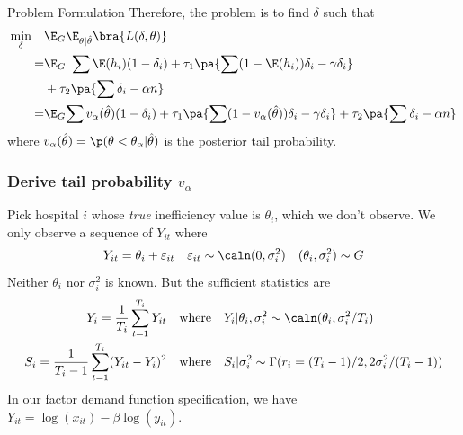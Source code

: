 \documentclass[10pt, aspectratio=169]{beamer}
\begin{document}
\begin{frame}{Problem Formulation}
  Therefore, the {problem} is to find $\delta$ such that
  \begin{align*}
    \min_{\delta} \quad & \E_G\E_{\theta|\hat{\theta}}\bra{L(\delta,\theta)}                                                                                                       \\
    =                   & \E_G \ \sum \E(h_i)(1-\delta_i) +\tau_1\pa{\sum (1-\E(h_i))\delta_i -\gamma \delta_i}                                                                    \\
                        & + \tau_2 \pa{\sum \delta_i -\alpha n}                                                                                                                    \\
    =                   & \E_G{\sum v_\alpha(\hat{\theta})(1-\delta_i) +\tau_1\pa{\sum (1-v_\alpha(\hat{\theta}))\delta_i -\gamma \delta_i} + \tau_2 \pa{\sum \delta_i -\alpha n}}
  \end{align*}
  where $v_\alpha(\hat{\theta})=\p(\theta<\theta_\alpha|\hat{\theta})$ is the \alert{posterior tail probability}.

\end{frame}
\begin{frame}[label=observation]
  \frametitle{Derive tail probability $v_\alpha$}
  Pick hospital $i$ whose \textit{true} inefficiency value is $\theta_i$, which we don't observe. We only observe a sequence of $Y_{it}$ where
  \begin{equation*}
    Y_{it} = \theta_i + \varepsilon_{it} \quad \varepsilon_{it} \sim \caln(0,\sigma_i^2) \quad (\theta_i,\sigma_i^2) \sim G
  \end{equation*}
  Neither $\theta_i$ nor $\sigma_i^2$ is known. But the sufficient statistics are
  \begin{align*}
    Y_i=\frac{1}{T_i}\sum_{t=1}^{T_i}Y_{it}           & \quad \text{where}\quad Y_i|\theta_i,\sigma_i^2 \sim \caln(\theta_i,\sigma_i^2/T_i)     \\
    S_i=\frac{1}{T_i-1}\sum_{t=1}^{T_i}(Y_{it}-Y_i)^2 & \quad \text{where} \quad S_i|\sigma_i^2 \sim \Gamma(r_i= (T_i-1)/2,2\sigma_i^2/(T_i-1))
  \end{align*}
  In our factor demand function specification, we have $Y_{it}=\log(x_{it})-\beta\log(y_{it})$. \hyperlink{normality}{}
\end{frame}
\end{document}
